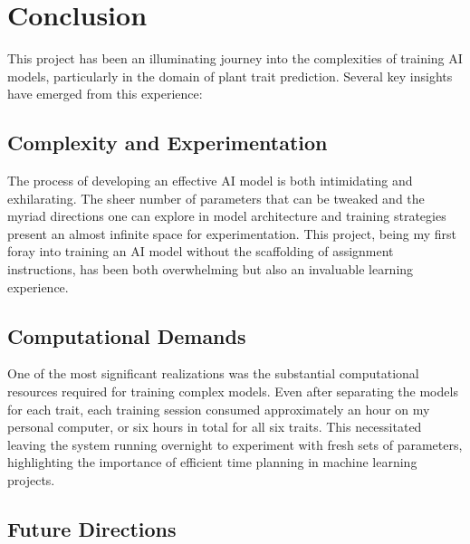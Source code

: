 \documentclass{article}
\begin{document}
\section{Conclusion}

This project has been an illuminating journey into the complexities of training AI models, particularly in the domain of plant trait prediction. Several key insights have emerged from this experience:

\subsection{Complexity and Experimentation}

The process of developing an effective AI model is both intimidating and exhilarating. The sheer number of parameters that can be tweaked and the myriad directions one can explore in model architecture and training strategies present an almost infinite space for experimentation. This project, being my first foray into training an AI model without the scaffolding of assignment instructions, has been both overwhelming but also an invaluable learning experience.

\subsection{Computational Demands}

One of the most significant realizations was the substantial computational resources required for training complex models. Even after separating the models for each trait, each training session consumed approximately an hour on my personal computer, or six hours in total for all six traits. This necessitated leaving the system running overnight to experiment with fresh sets of parameters, highlighting the importance of efficient time planning in machine learning projects.

\subsection{Future Directions}
\end{document}
